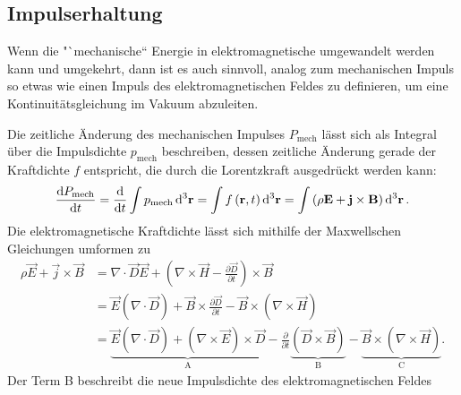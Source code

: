 \subsection{Impulserhaltung}

Wenn die "`mechanische`` Energie in elektromagnetische umgewandelt werden kann und umgekehrt, dann ist es auch sinnvoll, analog zum mechanischen Impuls so etwas wie einen Impuls des elektromagnetischen Feldes zu definieren, um eine Kontinuitätsgleichung im Vakuum abzuleiten.

Die zeitliche Änderung des mechanischen Impulses $P_{\mathrm{mech}}$ lässt sich als Integral über die Impulsdichte $p_{\mathrm{mech}}$ beschreiben, dessen zeitliche Änderung gerade der Kraftdichte $f$ entspricht, die durch die Lorentzkraft ausgedrückt werden kann:
\begin{equation*}
	\frac{\diff P_{\mathrm{mech}}}{\diff t}=\frac{\diff }{\diff t}\int p_{\mathrm{mech}}\diffa[3]{\vec{r}}=\int f\left(\vec {r},t\right)\diffa[3]{\vec{r}}=\int \left(\rho \vec {E}+\vec {j}\times \vec {B}\right)\diffa[3]{\vec{r}}.
\end{equation*}
Die elektromagnetische Kraftdichte lässt sich mithilfe der Maxwellschen Gleichungen umformen zu
\begin{align*}
	\rho \vec {E}+\vec {j}\times \vec {B} & =\nabla \cdot \vec {D}\vec {E}+\left(\nabla \times \vec {H}-\frac{\partial \vec {D}}{\partial t}\right)\times \vec {B}                                                                                                                                                                                                          \\
	                                      & =\vec {E}\left(\nabla \cdot \vec {D}\right)+\vec {B}\times \frac{\partial \vec {D}}{\partial t}-\vec {B}\times \left(\nabla \times \vec {H}\right)                                                                                                                                                                              \\
	                                      & =\underset{\mathrm{A}}{\underbrace{\vec {E}\left(\nabla \cdot \vec {D}\right)+\left(\nabla \times \vec {E}\right)\times \vec {D}}}-\frac{\partial }{\partial t}\underset{\mathrm{B}}{\underbrace{\left(\vec {D}\times \vec {B}\right)}}-\underset{\mathrm{C}}{\underbrace{\vec {B}\times \left(\nabla \times \vec {H}\right)}}.
\end{align*}
Der Term B beschreibt die neue Impulsdichte des elektromagnetischen Feldes
